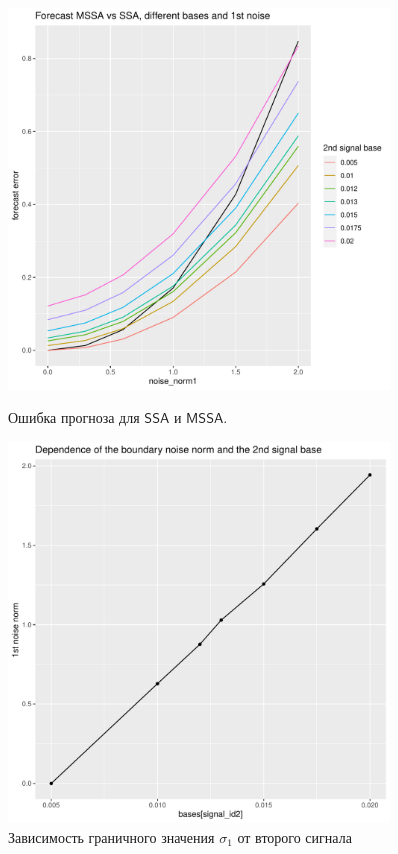 \documentclass[specialist, substylefile = spbureport.rtx,
    subf,href,colorlinks=true, 12pt]{disser}
\newcommand{\SSA}{\mathsf{SSA}}
\newcommand{\MSSA}{\mathsf{MSSA}}
\begin{document}
        \begin{figure}[h]
            \centering
            \begin{minipage}{.5\textwidth}
                \centering
                \includegraphics[width=0.9\textwidth]{experiment_2_exp1.pdf}
                \caption{Ошибка прогноза для $\SSA$ и $\MSSA$.}
                \label{fig:exp2_exp1}
            \end{minipage}%
            \begin{minipage}{.5\textwidth}
                \centering
            \includegraphics[width=0.9\textwidth]{experiment_2_exp2.pdf}
            \caption{Зависимость граничного значения $\sigma_1$ от второго сигнала}
            \label{fig:exp2_exp2}
            \end{minipage}
        \end{figure}
\end{document}
